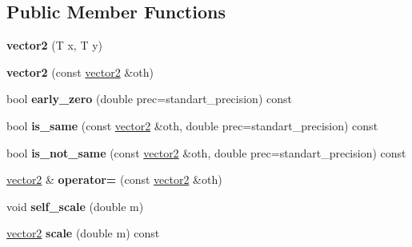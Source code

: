 \subsection*{Public Member Functions}
\begin{DoxyCompactItemize}
\item 
{\bfseries vector2} (T x, T y)\hypertarget{classmalgo_1_1vector2_aa7e8f255c7a2e35ad1ae65c5d8c81b93}{}\label{classmalgo_1_1vector2_aa7e8f255c7a2e35ad1ae65c5d8c81b93}

\item 
{\bfseries vector2} (const \hyperlink{classmalgo_1_1vector2}{vector2} \&oth)\hypertarget{classmalgo_1_1vector2_a7a4fd2ae0a9df209d0c690fa480c250f}{}\label{classmalgo_1_1vector2_a7a4fd2ae0a9df209d0c690fa480c250f}

\item 
bool {\bfseries early\+\_\+zero} (double prec=standart\+\_\+precision) const \hypertarget{classmalgo_1_1vector2_a84aa57a20a88c61804dda3c66de074db}{}\label{classmalgo_1_1vector2_a84aa57a20a88c61804dda3c66de074db}

\item 
bool {\bfseries is\+\_\+same} (const \hyperlink{classmalgo_1_1vector2}{vector2} \&oth, double prec=standart\+\_\+precision) const \hypertarget{classmalgo_1_1vector2_a8dd3f6937950e0acf64d90b35799470b}{}\label{classmalgo_1_1vector2_a8dd3f6937950e0acf64d90b35799470b}

\item 
bool {\bfseries is\+\_\+not\+\_\+same} (const \hyperlink{classmalgo_1_1vector2}{vector2} \&oth, double prec=standart\+\_\+precision) const \hypertarget{classmalgo_1_1vector2_a642b50a4101b92421c1815b045268b4c}{}\label{classmalgo_1_1vector2_a642b50a4101b92421c1815b045268b4c}

\item 
\hyperlink{classmalgo_1_1vector2}{vector2} \& {\bfseries operator=} (const \hyperlink{classmalgo_1_1vector2}{vector2} \&oth)\hypertarget{classmalgo_1_1vector2_af984009b91c3cd04e3476c5e6cb2fd93}{}\label{classmalgo_1_1vector2_af984009b91c3cd04e3476c5e6cb2fd93}

\item 
void {\bfseries self\+\_\+scale} (double m)\hypertarget{classmalgo_1_1vector2_a35838d056d5615466d7e33f476fee698}{}\label{classmalgo_1_1vector2_a35838d056d5615466d7e33f476fee698}

\item 
\hyperlink{classmalgo_1_1vector2}{vector2} {\bfseries scale} (double m) const \hypertarget{classmalgo_1_1vector2_a841208c2225217b8ffb16365cf336c54}{}\label{classmalgo_1_1vector2_a841208c2225217b8ffb16365cf336c54}


\end{DoxyCompactItemize}
